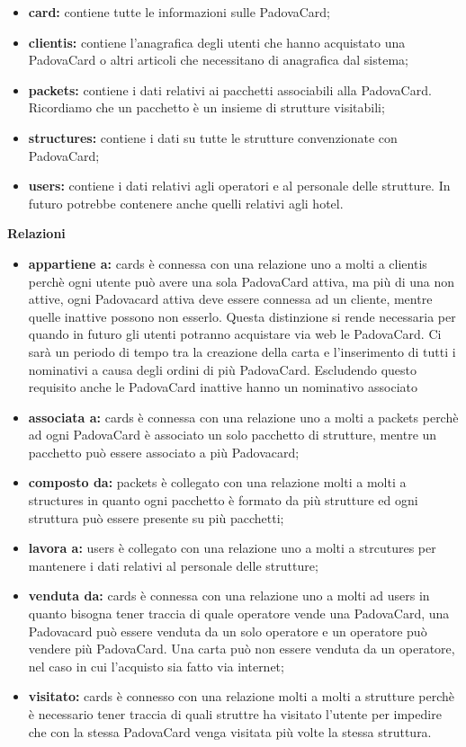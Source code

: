 \begin{itemize}
\item \textbf{card:} contiene tutte le informazioni sulle PadovaCard;
\item \textbf{clientis:} contiene l'anagrafica degli utenti che hanno acquistato una PadovaCard o altri articoli che necessitano di anagrafica dal sistema;
\item \textbf{packets:} contiene i dati relativi ai pacchetti associabili alla PadovaCard. Ricordiamo che un pacchetto è un insieme di strutture visitabili;
\item \textbf{structures:} contiene i dati su tutte le strutture convenzionate con PadovaCard;
\item \textbf{users:} contiene i dati relativi agli operatori e al personale delle strutture. In futuro potrebbe contenere anche quelli relativi agli hotel.
\end{itemize}
\textbf{Relazioni}
\begin{itemize}
\item \textbf{appartiene a:} cards è connessa con una relazione uno a molti a clientis perchè ogni utente può avere una sola PadovaCard attiva, ma più di una non attive, ogni Padovacard attiva deve essere connessa ad un cliente, mentre quelle inattive possono non esserlo. Questa distinzione si rende necessaria per quando in futuro gli utenti potranno acquistare via web le PadovaCard. Ci sarà un periodo di tempo tra la creazione della carta e l'inserimento di tutti i nominativi a causa degli ordini di più PadovaCard. Escludendo questo requisito anche le PadovaCard inattive hanno un nominativo associato
\item \textbf{associata a:} cards è connessa con una relazione uno a molti a packets perchè ad ogni PadovaCard è associato un solo pacchetto di strutture, mentre un pacchetto può essere associato a più Padovacard;
\item \textbf{composto da:} packets è collegato con una relazione molti a molti a structures in quanto ogni pacchetto è formato da più strutture ed ogni struttura può essere presente su più pacchetti;
\item \textbf{lavora a:} users è collegato con una relazione uno a molti a strcutures per mantenere i dati relativi al personale delle strutture;
\item \textbf{venduta da:} cards è connessa con una relazione uno a molti ad users in quanto bisogna tener traccia di quale operatore vende una PadovaCard, una Padovacard può essere venduta da un solo operatore e un operatore può vendere più PadovaCard. Una carta può non essere venduta da un operatore, nel caso in cui l'acquisto sia fatto via internet;
\item \textbf{visitato:} cards è connesso con una relazione molti a molti a strutture perchè è necessario tener traccia di quali struttre ha visitato l'utente per impedire che con la stessa PadovaCard venga visitata più volte la stessa struttura.


\end{itemize}


